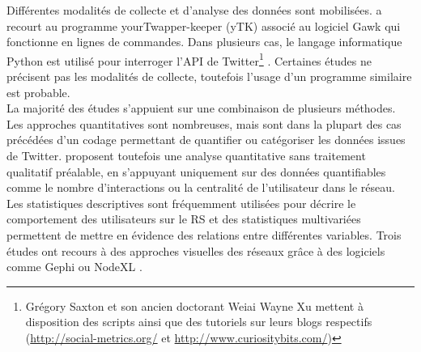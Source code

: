         Différentes modalités de collecte et d’analyse des données sont mobilisées. \textcite{bruns2012how} a recourt au programme yourTwapper-keeper (yTK) associé au logiciel Gawk qui fonctionne en lignes de commandes. Dans plusieurs cas, le langage informatique Python est utilisé pour interroger l’API de Twitter\footnote{Grégory Saxton et son ancien doctorant Weiai Wayne Xu mettent à disposition des scripts ainsi que des tutoriels sur leurs blogs respectifs (\url{http://social-metrics.org/} et \url{http://www.curiositybits.com/}) } \parencite{guo2014tweeting,guo2017speaking,stefanone2015image,xu2014twitter,xu2014talking}. Certaines études ne précisent pas les modalités de collecte, toutefois l’usage d’un programme similaire est probable.\\

        La majorité des études s’appuient sur une combinaison de plusieurs méthodes. Les approches quantitatives sont nombreuses, mais sont dans la plupart des cas précédées d’un codage permettant de quantifier ou catégoriser les données issues de Twitter. \textcite{xu2019does} proposent toutefois une analyse quantitative sans traitement qualitatif préalable, en s'appuyant uniquement sur des données quantifiables comme le nombre d'interactions ou la centralité de l'utilisateur dans le réseau. Les statistiques descriptives sont fréquemment utilisées pour décrire le comportement des utilisateurs sur le RS et des statistiques multivariées permettent de mettre en évidence des relations entre différentes variables. Trois études ont recours à des approches visuelles des réseaux grâce à des logiciels comme Gephi ou NodeXL \parencite{bruns2012how,xu2014twitter,xu2014talking}.\\
        \clearpage

